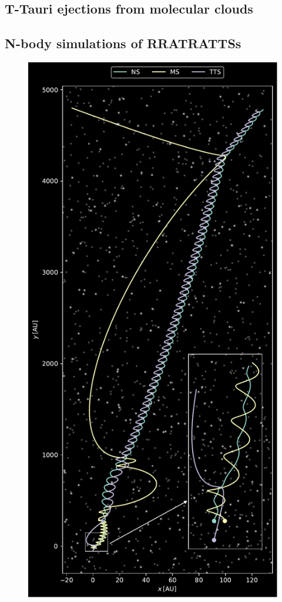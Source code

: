 \documentclass[twocolumn, twocolappendix]{aastex631}
\newcommand{\binaryRAT}{RRATRATTS\xspace}
\begin{document}
\subsection{T-Tauri ejections from molecular clouds}\label{sec:tts_ejections}


\subsection{N-body simulations of \binaryRAT{}s}

\begin{figure}[htb]
    \centering
    \includegraphics[width=\columnwidth]{rat_formation.pdf}

\end{figure}
\end{document}

